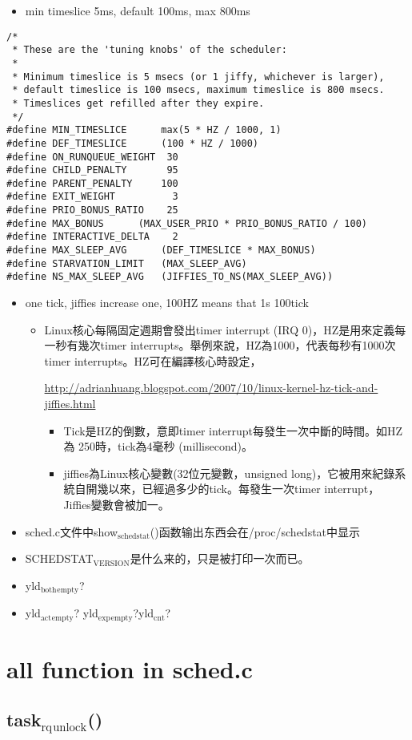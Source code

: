 \documentclass[11pt]{article}
\begin{document}
\begin{itemize}
\item min timeslice 5ms, default 100ms, max 800ms
\end{itemize}
\begin{verbatim}
/*
 * These are the 'tuning knobs' of the scheduler:
 *
 * Minimum timeslice is 5 msecs (or 1 jiffy, whichever is larger),
 * default timeslice is 100 msecs, maximum timeslice is 800 msecs.
 * Timeslices get refilled after they expire.
 */
#define MIN_TIMESLICE      max(5 * HZ / 1000, 1)
#define DEF_TIMESLICE      (100 * HZ / 1000)
#define ON_RUNQUEUE_WEIGHT  30
#define CHILD_PENALTY       95
#define PARENT_PENALTY     100
#define EXIT_WEIGHT          3
#define PRIO_BONUS_RATIO    25
#define MAX_BONUS      (MAX_USER_PRIO * PRIO_BONUS_RATIO / 100)
#define INTERACTIVE_DELTA    2
#define MAX_SLEEP_AVG      (DEF_TIMESLICE * MAX_BONUS)
#define STARVATION_LIMIT   (MAX_SLEEP_AVG)
#define NS_MAX_SLEEP_AVG   (JIFFIES_TO_NS(MAX_SLEEP_AVG))
\end{verbatim}



\begin{itemize}
\item one tick, jiffies increase one, 100HZ means that 1s 100tick

\begin{itemize}
\item Linux核心每隔固定週期會發出timer interrupt (IRQ 0)，HZ是用來定義每
    一秒有幾次timer interrupts。舉例來說，HZ為1000，代表每秒有1000次
    timer interrupts。HZ可在編譯核心時設定，

    \href{http://adrianhuang.blogspot.com/2007/10/linux-kernel-hz-tick-and-jiffies.html}{http://adrianhuang.blogspot.com/2007/10/linux-kernel-hz-tick-and-jiffies.html}

\begin{itemize}
\item Tick是HZ的倒數，意即timer interrupt每發生一次中斷的時間。如HZ為
     250時，tick為4毫秒 (millisecond)。
\item jiffies為Linux核心變數(32位元變數，unsigned long)，它被用來紀錄系
     統自開幾以來，已經過多少的tick。每發生一次timer interrupt，
     Jiffies變數會被加一。
\end{itemize}

\end{itemize}

\item sched.c文件中show$_{\mathrm{schedstat}}$()函数输出东西会在/proc/schedstat中显示
\item SCHEDSTAT$_{\mathrm{VERSION}}$是什么来的，只是被打印一次而已。
\item yld$_{\mathrm{both}}$$_{\mathrm{empty}}$?
\item yld$_{\mathrm{act}}$$_{\mathrm{empty}}$? yld$_{\mathrm{exp}}$$_{\mathrm{empty}}$?yld$_{\mathrm{cnt}}$?
\end{itemize}
\section{all function in sched.c}
\label{sec-4}

\subsection{task$_{\mathrm{rq}}$$_{\mathrm{unlock}}$()}
\label{sec-4.1}
\end{document}
